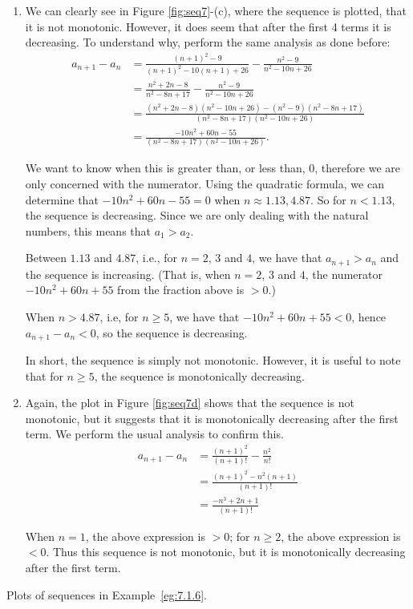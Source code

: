 \begin{example}
\begin{enumerate}[1)]
\item We can clearly see in Figure \ref{fig:seq7}-(c), where the sequence is plotted, that it is not monotonic. However, it does seem that after the first 4 terms it is decreasing. To understand why, perform the same analysis as done before:
\begin{align*}
a_{n+1}-a_n &= \frac{(n+1)^2-9}{(n+1)^2-10(n+1)+26} - \frac{n^2-9}{n^2-10n+26} \\		
&= \frac{n^2+2n-8}{n^2-8n+17}-\frac{n^2-9}{n^2-10n+26}\\
&= \frac{(n^2+2n-8)(n^2-10n+26)-(n^2-9)(n^2-8n+17)}{(n^2-8n+17)(n^2-10n+26)}\\
&= \frac{-10n^2+60n-55}{(n^2-8n+17)(n^2-10n+26)}.
\end{align*}

We want to know when this is greater than, or less than, $0$, therefore we are only concerned with the numerator. Using the quadratic formula, we can determine that $-10n^2+60n-55=0$ when $n\approx 1.13, 4.87$. So for $n<1.13$, the sequence is decreasing. Since we are only dealing with the natural numbers, this means that $a_1 > a_2$.

Between $1.13$ and $4.87$, i.e., for $n=2$, $3$ and $4$, we have that $a_{n+1}>a_n$ and the sequence is increasing. (That is, when $n=2$, $3$ and $4$, the numerator $-10n^2+60n+55$ from the fraction above is $>0$.)

When $n> 4.87$, i.e, for $n\geq 5$, we have that $-10n^2+60n+55<0$, hence $a_{n+1}-a_n<0$, so the sequence is decreasing.

In short, the sequence is simply not monotonic. However, it is useful to note that for $n\geq 5$, the sequence is monotonically decreasing. 

\item Again, the plot in Figure \ref{fig:seq7d} shows that the sequence is not monotonic, but it suggests that it is monotonically decreasing after the first term. We perform the usual analysis to confirm this.
\begin{align*}	
a_{n+1}-a_n &= \frac{(n+1)^2}{(n+1)!} - \frac{n^2}{n!} \\
&= \frac{(n+1)^2-n^2(n+1)}{(n+1)!} \\
&=	\frac{-n^3+2n+1}{(n+1)!}
\end{align*}
					
When $n=1$, the above expression is $>0$; for $n\geq 2$, the above expression is $<0$. Thus this sequence is not monotonic, but it is monotonically decreasing after the first term.
\end{enumerate}
\end{example}

\begin{marginfigure}[-6cm] %
\caption{Plots of sequences in Example~\ref{eg:7.1.6}.}
\label{fig:seq7d}
\end{marginfigure}